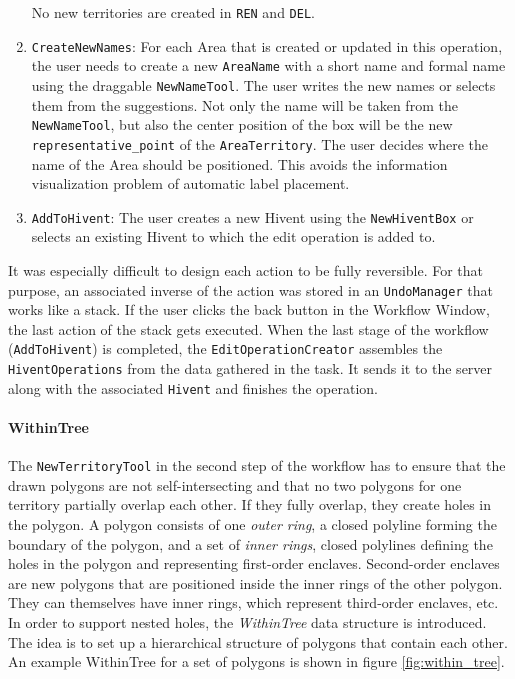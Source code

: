 \begin{enumerate}
\begin{itemize}
  \end{itemize}
  No new territories are created in \texttt{REN} and \texttt{DEL}.

  \item \texttt{CreateNewNames}: For each Area that is created or updated in this operation, the user needs to create a new \texttt{AreaName} with a short name and formal name using the draggable \texttt{NewNameTool}. The user writes the new names or selects them from the suggestions. Not only the name will be taken from the \texttt{NewNameTool}, but also the center position of the box will be the new \texttt{representative\_point} of the \texttt{AreaTerritory}. The user decides where the name of the Area should be positioned. This avoids the information visualization problem of automatic label placement.

  \item \texttt{AddToHivent}: The user creates a new Hivent using the \texttt{NewHiventBox} or selects an existing Hivent to which the edit operation is added to.

\end{enumerate}

It was especially difficult to design each action to be fully reversible. For that purpose, an associated inverse of the action was stored in an \texttt{UndoManager} that works like a stack. If the user clicks the back button in the Workflow Window, the last action of the stack gets executed. When the last stage of the workflow (\texttt{AddToHivent}) is completed, the \texttt{EditOperationCreator} assembles the \texttt{HiventOperations} from the data gathered in the task. It sends it to the server along with the associated \texttt{Hivent} and finishes the operation.



\paragraph{WithinTree} %
\label{par:within_tree}

The \texttt{NewTerritoryTool} in the second step of the workflow has to ensure that the drawn polygons are not self-intersecting and that no two polygons for one territory partially overlap each other. If they fully overlap, they create holes in the polygon. A polygon consists of one \emph{outer ring}, a closed polyline forming the boundary of the polygon, and a set of \emph{inner rings}, closed polylines defining the holes in the polygon and representing first-order enclaves. Second-order enclaves are new polygons that are positioned inside the inner rings of the other polygon. They can themselves have inner rings, which represent third-order enclaves, etc. In order to support nested holes, the \emph{WithinTree} data structure is introduced. The idea is to set up a hierarchical structure of polygons that contain each other. An example WithinTree for a set of polygons is shown in figure \ref{fig:within_tree}.

